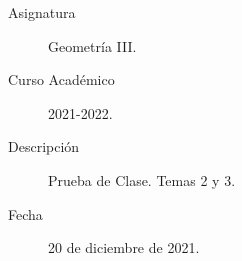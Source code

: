 \documentclass[12pt]{article}
\begin{document}

    
    

    
    \begin{description}
        \item[Asignatura] Geometría III.
        \item[Curso Académico] 2021-2022.
        \item[Descripción] Prueba de Clase. Temas 2 y 3.
        \item[Fecha] 20 de diciembre de 2021.
    
    \end{description}
    \newpage
\end{document}
